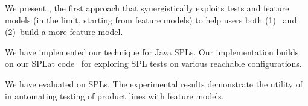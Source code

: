 \begin{Contributions}
\setlength{\itemsep}{1pt}
\setlength{\parskip}{0pt}
\setlength{\parsep}{0pt}

 We present \tname, the first approach that
synergistically exploits tests and \incomplete{} feature models (in
the limit, starting from \Empty{} feature models) to help users both
(1)~ and (2)~build a more
\complete{} feature model.

 We have implemented our \tname{}
technique for Java SPLs.  Our implementation builds on our SPLat
code~\cite{kim-etal-fse2013, SPLatWebSite} for exploring SPL tests on
various reachable configurations.

 We have evaluated \tname{} on \numsubjects{} SPLs.
The experimental results demonstrate the utility of \tname{} in
automating testing of product lines with \incomplete{} feature models.

\end{Contributions}


